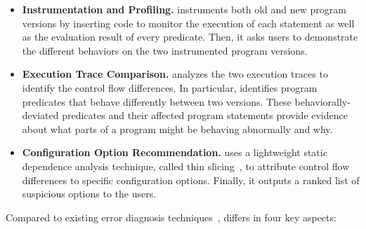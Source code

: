 \vspace{-2mm}

\begin{itemize}

\item \textbf{Instrumentation and Profiling.} \ourtool
instruments both old and new program versions by inserting
code to monitor the execution of each statement as well as the
evaluation result of every predicate. Then, it asks users to
demonstrate the different behaviors on the two instrumented
program versions. 

\item \textbf{Execution Trace Comparison.}
\ourtool analyzes the two execution traces to identify
the control flow differences. In particular, \ourtool
identifies program predicates that behave
differently between two versions. These
behaviorally-deviated predicates and their
affected program statements
provide evidence about what parts of a program might
be behaving abnormally and why.

\item \textbf{Configuration Option Recommendation.} 
\ourtool uses a lightweight static dependence analysis
technique, called thin slicing~\cite{Sridharan:2007}, to attribute
control flow differences to specific configuration options.
Finally, it outputs a ranked list of suspicious options to the users.


\end{itemize}

Compared to existing error diagnosis
techniques~\cite{Wang:2004:AMT, Rabkin:2011:PPC, Whitaker:2004:CDS,
Zhang:2013:ADS, Attariyan:2010:ACT, Su:2007:AIC, Attariyan:2008:UCD, xray
}, \ourtool differs in four
key aspects:

